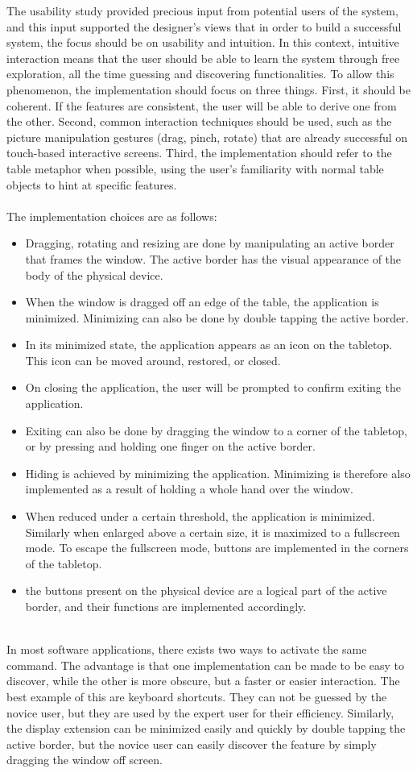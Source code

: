 The usability study provided precious input from potential users of the system, and this input supported the designer's views that in order to build a successful system, the focus should be on usability and intuition.
In this context, intuitive interaction means that the user should be able to learn the system through free exploration, all the time guessing and discovering functionalities.
To allow this phenomenon, the implementation should focus on three things.
First, it should be coherent. If the features are consistent, the user will be able to derive one from the other.
Second, common interaction techniques should be used, such as the picture manipulation gestures (drag, pinch, rotate) that are already successful on touch-based interactive screens.
Third, the implementation should refer to the table metaphor when possible, using the user's familiarity with normal table objects to hint at specific features.\\
\hfill\\
The implementation choices are as follows:
\begin{itemize}
\item Dragging, rotating and resizing are done by manipulating an active border that frames the window. The active border has the visual appearance of the body of the physical device.
\item When the window is dragged off an edge of the table, the application is minimized. Minimizing can also be done by double tapping the active border.
\item In its minimized state, the application appears as an icon on the tabletop. This icon can be moved around, restored, or closed.
\item On closing the application, the user will be prompted to confirm exiting the application.
\item Exiting can also be done by dragging the window to a corner of the tabletop, or by pressing and holding one finger on the active border.
\item Hiding is achieved by minimizing the application. Minimizing is therefore also implemented as a result of holding a whole hand over the window.
\item When reduced under a certain threshold, the application is minimized. Similarly when enlarged above a certain size, it is maximized to a fullscreen mode. To escape the fullscreen mode, buttons are implemented in the corners of the tabletop.
\item the buttons present on the physical device are a logical part of the active border, and their functions are implemented accordingly.
\end{itemize}
\hfill\\
In most software applications, there exists two ways to activate the same command.
The advantage is that one implementation can be made to be easy to discover, while the other is more obscure, but a faster or easier interaction.
The best example of this are keyboard shortcuts. They can not be guessed by the novice user, but they are used by the expert user for their efficiency.
Similarly, the display extension can be minimized easily and quickly by double tapping the active border, but the novice user can easily discover the feature by simply dragging the window off screen.
